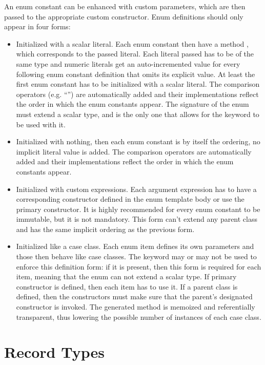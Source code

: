 An enum constant can be enhanced with custom parameters, which are then passed to the appropriate custom constructor. Enum definitions should only appear in four forms: 
\begin{itemize}
  \item Initialized with a scalar literal. Each enum constant then have a method , which corresponds to the passed literal. Each literal passed has to be of the same type and numeric literals get an auto-incremented value for every following enum constant definition that omits its explicit value. At least the first enum constant has to be initialized with a scalar literal. The comparison operators (e.g. ``\code{<}'') are automatically added and their implementations reflect the order in which the enum constants appear. The signature of the enum must extend a scalar type, and is the only one that allows for the  keyword to be used with it.
  \item Initialized with nothing, then each enum constant is by itself the ordering, no implicit literal value is added. The comparison operators are automatically added and their implementations reflect the order in which the enum constants appear. 
  \item Initialized with custom expressions. Each argument expression has to have a corresponding constructor defined in the enum template body or use the primary constructor. It is highly recommended for every enum constant to be immutable, but it is not mandatory. This form can't extend any parent class and has the same implicit ordering as the previous form. 
  \item Initialized like a case class. Each enum item defines its own parameters and those then behave like case classes. The  keyword may or may not be used to enforce this definition form: if it is present, then this form is required for each item, meaning that the enum can not extend a scalar type. If primary constructor is defined, then each item has to use it. If a parent class is defined, then the constructors must make sure that the parent's designated constructor is invoked. The generated  method is memoized and referentially transparent, thus lowering the possible number of instances of each case class. 
\end{itemize}




\section{Record Types}
\label{sec:record-types}

